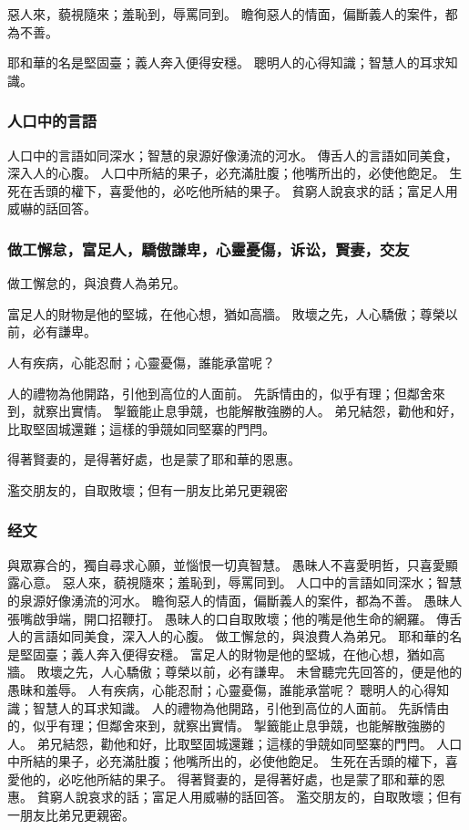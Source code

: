 惡人來，藐視隨來；羞恥到，辱罵同到。
瞻徇惡人的情面，偏斷義人的案件，都為不善。

耶和華的名是堅固臺；義人奔入便得安穩。
聰明人的心得知識；智慧人的耳求知識。

\subsubsection{人口中的言語}
人口中的言語如同深水；智慧的泉源好像湧流的河水。
傳舌人的言語如同美食，深入人的心腹。
人口中所結的果子，必充滿肚腹；他嘴所出的，必使他飽足。
生死在舌頭的權下，喜愛他的，必吃他所結的果子。
貧窮人說哀求的話；富足人用威嚇的話回答。

\subsubsection{做工懈怠，富足人，驕傲謙卑，心靈憂傷，诉讼，賢妻，交友}
做工懈怠的，與浪費人為弟兄。

富足人的財物是他的堅城，在他心想，猶如高牆。
敗壞之先，人心驕傲；尊榮以前，必有謙卑。

人有疾病，心能忍耐；心靈憂傷，誰能承當呢？

人的禮物為他開路，引他到高位的人面前。
先訴情由的，似乎有理；但鄰舍來到，就察出實情。
掣籤能止息爭競，也能解散強勝的人。
弟兄結怨，勸他和好，比取堅固城還難；這樣的爭競如同堅寨的門閂。

得著賢妻的，是得著好處，也是蒙了耶和華的恩惠。

濫交朋友的，自取敗壞；但有一朋友比弟兄更親密

\subsubsection{经文}
與眾寡合的，獨自尋求心願，並惱恨一切真智慧。
愚昧人不喜愛明哲，只喜愛顯露心意。
惡人來，藐視隨來；羞恥到，辱罵同到。
人口中的言語如同深水；智慧的泉源好像湧流的河水。
瞻徇惡人的情面，偏斷義人的案件，都為不善。
愚昧人張嘴啟爭端，開口招鞭打。
愚昧人的口自取敗壞；他的嘴是他生命的網羅。
傳舌人的言語如同美食，深入人的心腹。
做工懈怠的，與浪費人為弟兄。
耶和華的名是堅固臺；義人奔入便得安穩。
富足人的財物是他的堅城，在他心想，猶如高牆。
敗壞之先，人心驕傲；尊榮以前，必有謙卑。
未曾聽完先回答的，便是他的愚昧和羞辱。
人有疾病，心能忍耐；心靈憂傷，誰能承當呢？
聰明人的心得知識；智慧人的耳求知識。
人的禮物為他開路，引他到高位的人面前。
先訴情由的，似乎有理；但鄰舍來到，就察出實情。
掣籤能止息爭競，也能解散強勝的人。
弟兄結怨，勸他和好，比取堅固城還難；這樣的爭競如同堅寨的門閂。
人口中所結的果子，必充滿肚腹；他嘴所出的，必使他飽足。
生死在舌頭的權下，喜愛他的，必吃他所結的果子。
得著賢妻的，是得著好處，也是蒙了耶和華的恩惠。
貧窮人說哀求的話；富足人用威嚇的話回答。
濫交朋友的，自取敗壞；但有一朋友比弟兄更親密。


